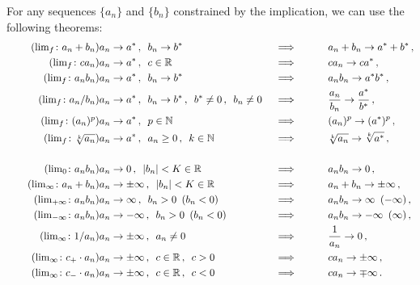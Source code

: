 \documentclass[week=3]{homework}
\begin{document}
\begin{questions}
	    For any sequences $\{a_n\}$ and $\{b_n\}$ constrained by the implication, we can use the following theorems:	    
	    \begin{alignat}{3}
		    \label{th:lim:a+b:finite} \tag{$\lim_f\colon a_n+b_n$}		a_n &\to a^* \,, \enskip b_n \to b^* \qquad &&\implies \qquad &&a_n + b_n \to a^* + b^*\,, \\
		    \label{th:lim:c*a:finite} \tag{$\lim_f\colon ca_n$}	a_n &\to a^* \,, \enskip c \in \reals \qquad &&\implies \qquad &&ca_n \to ca^*\,, \\
	    	\label{th:lim:a*b:finite} \tag{$\lim_f\colon a_nb_n$}	a_n &\to a^* \,, \enskip b_n \to b^* \qquad &&\implies \qquad &&a_nb_n \to a^*b^*\,, \\
	    	\label{th:lim:a/b:finite} \tag{$\lim_f\colon a_n/b_n$}		a_n &\to a^* \,, \enskip b_n \to b^* \,, \enskip b^* \neq 0\,, \enskip b_n \neq 0 &&\implies \qquad &&\frac{a_n}{b_n} \to \frac{a^*}{b^*} \,, \\
	    	\label{th:lim:a^p:finite} \tag{$\lim_f\colon (a_n)^p$}		a_n &\to a^* \,, \enskip p \in \naturals \qquad &&\implies \qquad &&(a_n)^p \to (a^*)^p \,, \\
	    	\label{th:lim:k root a:finite} \tag{$\lim_f\colon \sqrt[k]{a_n}$}	a_n &\to a^* \,, \enskip a_n \geq 0\,, \enskip k \in \naturals \quad &&\implies \qquad &&\sqrt[k]{a_n} \to \sqrt[k]{a^*} \,, \\
	    	\nonumber\\
	    	\label{th:lim:a->0*b:finite} \tag{$\lim_0\colon a_nb_n$}	a_n &\to 0 \,, \enskip |b_n| < K \in \reals \quad &&\implies \qquad &&a_nb_n \to 0\,, \\
	    	\label{th:lim:a+b:infinite} \tag{$\lim_\infty\colon a_n + b_n$}	a_n &\to \pm\infty \,, \enskip |b_n| < K \in \reals \quad &&\implies \qquad &&a_n + b_n \to \pm\infty\,, \\	
	    	\label{th:lim:a*b:infinite+} \tag{$\lim_{+\infty}\colon a_nb_n$}	a_n &\to \infty \,, \enskip b_n > 0 \enskip (b_n < 0) \quad &&\implies \qquad &&a_nb_n \to \infty \enskip (-\infty)\,, \\
	    	\label{th:lim:a*b:infinite-} \tag{$\lim_{-\infty}\colon a_nb_n$}	a_n &\to -\infty \,, \enskip b_n > 0 \enskip (b_n < 0) \quad &&\implies \qquad &&a_nb_n \to -\infty \enskip (\infty)\,, \\
	    	\label{th:lim:1/a:infinite} \tag{$\lim_\infty\colon 1/a_n$}	a_n &\to \pm\infty \,, \enskip a_n \neq 0 \quad &&\implies \qquad &&\frac{1}{a_n} \to 0\,, \\
	    	\label{th:lim:c+*a:infinite} \tag{$\lim_\infty\colon c_+ \cdot a_n$}	a_n &\to \pm\infty \,, \enskip c \in \reals\,, \enskip c > 0 \quad &&\implies \qquad &&ca_n \to \pm\infty\,, \\
	    	\label{th:lim:c-*a:infinite} \tag{$\lim_\infty\colon c_- \cdot a_n$}	a_n &\to \pm\infty \,, \enskip c \in \reals\,, \enskip c < 0 \quad &&\implies \qquad &&ca_n \to \mp\infty\,.
	    \end{alignat}
	    \begin{parts}

\end{parts}
\end{questions}
\end{document}
